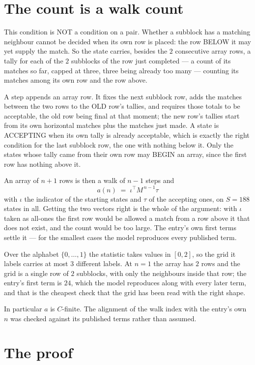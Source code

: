 \documentclass[11pt,a4paper]{article}
\theoremstyle{plain}
\theoremstyle{definition}
\begin{document}
\section{The count is a walk count}

This condition is NOT a condition on a pair. Whether a subblock has a
matching neighbour cannot be decided when its own row is placed: the row BELOW it may yet
supply the match. So the state carries, besides the $2$ consecutive array rows, a tally for
each of the $2$ subblocks of the row just completed --- a count of its matches so far, capped at three, three being already too many --- counting its matches
among its own row and the row above.

A step appends an array row. It fixes the next subblock row, adds the matches between the two
rows to the OLD row's tallies, and requires those totals to be acceptable, the old row being
final at that moment; the new row's tallies start from its own horizontal matches plus the
matches just made. A state is ACCEPTING when its own tally is already acceptable, which is
exactly the right condition for the last subblock row, the one with nothing below it. Only the
states whose tally came from their own row may BEGIN an array, since the first row has nothing
above it.

An array of $n+1$ rows is then a walk of $n-1$ steps and
\[
a(n)\;=\;\iota^{\!\top}M^{\,n-1}\tau
\]
with $\iota$ the indicator of the starting states and $\tau$ of the accepting ones, on
$S=188$ states in all. Getting the two vectors right is the whole of the argument: with
$\iota$ taken as all-ones the first row would be allowed a match from a row above it that does
not exist, and the count would be too large. The entry's own first terms settle it --- for
the smallest cases
the model reproduces every published term.

Over the alphabet $\{0,\dots,1\}$ the statistic takes values in $[0,2]$, so the
grid it labels carries at most $3$ different labels. At $n=1$ the array has $2$
rows and the grid is a single row of $2$
subblocks, with only the neighbours inside that row; the entry's first term is
$24$, which the model reproduces along with every later term, and that is the cheapest
check that the grid has been read with the right shape.

In particular $a$ is $C$-finite. The alignment of the walk index with the entry's own $n$ was
checked against its published terms rather than assumed.

\section{The proof}
\end{document}
